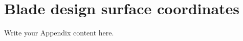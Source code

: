 \chapter{Blade design surface coordinates} %

\label{r67_coords_data} %


Write your Appendix content here.
\cite{Light1}
\cite{Light2}
\cite{curle}
\cite{FWH}
\cite{bladecompose}
\cite{r67design}
\cite{r67performance}
\cite{r67laser}

